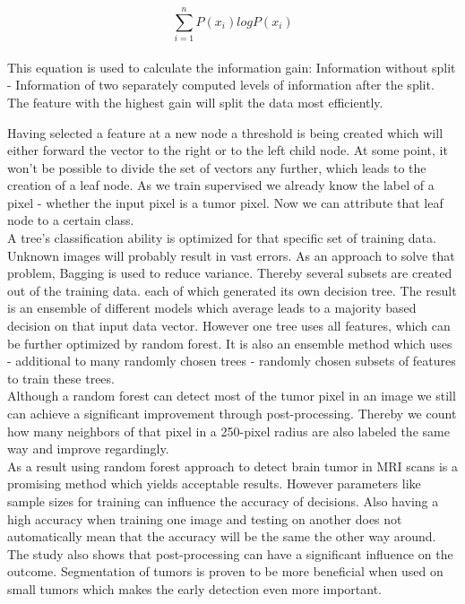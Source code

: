 \documentclass{article}
\begin{document}
  \[ \sum_{i=1}^n P(x_i) logP(x_i)\]\\

  This equation is used to calculate the information gain: Information without split - Information of two separately computed levels of information after the split. The feature with the highest gain will split the data most efficiently.

Having selected a feature at a new node a threshold is being created which will either forward the vector to the right or to the left child node. At some point, it won't be possible to divide the set of vectors any further, which leads to the creation of a leaf node. As we train supervised we already know the label of a pixel - whether the input pixel is a tumor pixel. Now we can attribute that leaf node to a certain class. \\


 A tree's classification ability is optimized for that specific set of training data. Unknown images will probably result in vast errors. As an approach to solve that problem, Bagging is used to reduce variance. Thereby several subsets are created out of the training data. each of which generated its own decision tree. The result is an ensemble of different models which average leads to a majority based decision on that input data vector. However one tree uses all features, which can be further optimized by random forest. It is also an ensemble method which uses - additional to many randomly chosen trees - randomly chosen subsets of features to train these trees. \\


 Although a random forest can detect most of the tumor pixel in an image we still can achieve a significant improvement through post-processing. Thereby we count how many neighbors of that pixel in a 250-pixel radius are also labeled the same way and improve regardingly. \\

 As a result using random forest approach to detect brain tumor in MRI scans is a promising method which yields acceptable results. However parameters like sample sizes for training can influence the accuracy of decisions. Also having a high accuracy when training one image and testing on another does not automatically mean that the accuracy will be the same the other way around. The study also shows that post-processing can have a significant influence on the outcome. Segmentation of tumors is proven to be more beneficial when used on small tumors which makes the early detection even more important. 
 
\end{document}
